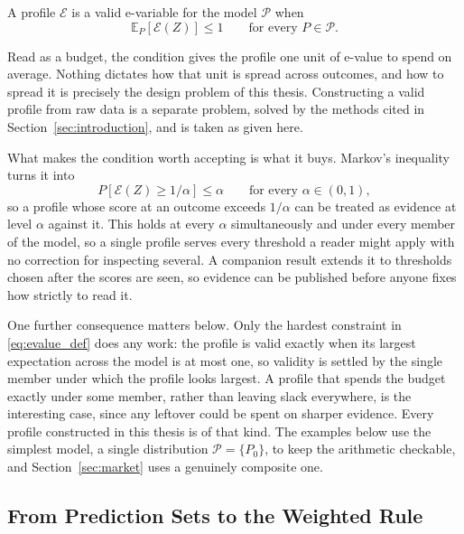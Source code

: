 A profile $\mathcal E$ is a valid e-variable for the model $\mathcal P$ when
\begin{equation}
  \mathbb E_{P}[\mathcal E(Z)]\leq1
  \qquad\text{for every }P\in\mathcal P .
  \label{eq:evalue_def}
\end{equation}

Read as a budget, the condition gives the profile one unit of e-value to spend
on average. Nothing dictates how that unit is spread across outcomes, and how to spread it is precisely the design problem of this
thesis. Constructing a valid profile from raw data is a separate problem,
solved by the methods cited in Section~\ref{sec:introduction}, and is taken as
given here.

What makes the condition worth accepting is what it buys. Markov's inequality
turns it into
\begin{equation}
  P[\mathcal E(Z)\geq1/\alpha]\leq\alpha
  \qquad\text{for every }\alpha\in(0,1),
  \label{eq:markov}
\end{equation}
so a profile whose score at an outcome exceeds $1/\alpha$ can be treated as
evidence at level $\alpha$ against it. This holds at every $\alpha$
simultaneously and under every member of the model, so a single profile serves
every threshold a reader might apply with no correction for inspecting
several. A companion result \citep{Grunwald2024,Koning2024posthoc} extends it
to thresholds chosen after the scores are seen, so evidence can be published
before anyone fixes how strictly to read it.

One further consequence matters below. Only the hardest constraint in
\eqref{eq:evalue_def} does any work: the profile is valid exactly when its
largest expectation across the model is at most one, so validity is settled by
the single member under which the profile looks largest. A profile
that spends the budget exactly under some member, rather than leaving slack
everywhere, is the interesting case, since any leftover could be spent on
sharper evidence. Every profile constructed in this thesis is of that kind. The
examples below use the simplest model, a single distribution
$\mathcal P=\{P_0\}$, to keep the arithmetic checkable, and
Section~\ref{sec:market} uses a genuinely composite one.

\subsection{From Prediction Sets to the Weighted Rule}\label{sec:rule}

